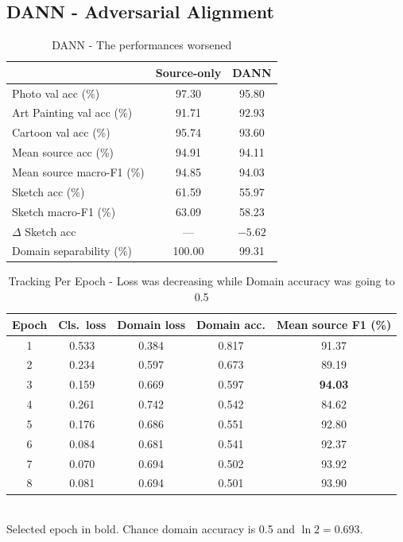 \documentclass{article}
\begin{document}
\subsection{DANN - Adversarial Alignment}

\begin{table}[H]
  \caption{DANN - The performances worsened}
  \label{tab:dann}
  \centering
  \begin{tabular}{lcc}
    \toprule
    & Source-only & DANN \\
    \midrule
    Photo val acc (\%)          & 97.30 & 95.80 \\
    Art Painting val acc (\%)   & 91.71 & 92.93 \\
    Cartoon val acc (\%)        & 95.74 & 93.60 \\
    \midrule
    Mean source acc (\%)        & 94.91 & 94.11 \\
    Mean source macro-F1 (\%)   & 94.85 & 94.03 \\
    \midrule
    Sketch acc (\%)             & 61.59 & 55.97 \\
    Sketch macro-F1 (\%)        & 63.09 & 58.23 \\
    $\Delta$ Sketch acc         & ---   & $-5.62$ \\
    Domain separability (\%)    & 100.00 & 99.31 \\
    \bottomrule
  \end{tabular}
\end{table}

\begin{table}[H]
  \caption{Tracking Per Epoch - Loss was decreasing while Domain accuracy was going to 0.5}
  \label{tab:dann-training}
  \centering
  \begin{tabular}{ccccc}
    \toprule
    Epoch & Cls.\ loss & Domain loss & Domain acc. & Mean source F1 (\%) \\
    \midrule
    1 & 0.533 & 0.384 & 0.817 & 91.37 \\
    2 & 0.234 & 0.597 & 0.673 & 89.19 \\
    3 & 0.159 & 0.669 & 0.597 & \textbf{94.03} \\
    4 & 0.261 & 0.742 & 0.542 & 84.62 \\
    5 & 0.176 & 0.686 & 0.551 & 92.80 \\
    6 & 0.084 & 0.681 & 0.541 & 92.37 \\
    7 & 0.070 & 0.694 & 0.502 & 93.92 \\
    8 & 0.081 & 0.694 & 0.501 & 93.90 \\
    \bottomrule
  \end{tabular}
  \\[2pt]
  \footnotesize Selected epoch in bold. Chance domain accuracy is 0.5 and $\ln 2 = 0.693$.
\end{table}
\end{document}
